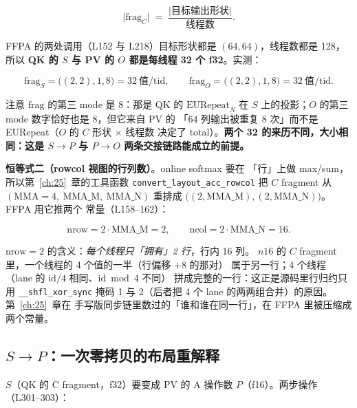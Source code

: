 \begin{equation}
  \bigl|\mathrm{frag}_C\bigr| \;=\;
  \frac{\bigl|\text{目标输出形状}\bigr|}{\text{线程数}} .
  \label{eq:26-csize}
\end{equation}

FFPA 的两处调用（L152 与 L218）目标形状都是 $(64,64)$，线程数都是 128，
所以 \textbf{QK 的 $S$ 与 PV 的 $O$ 都是每线程 32 个 f32}。实测：

\begin{equation}
  \mathrm{frag}_S = \bigl((2,2),1,8\bigr) = 32\ \text{值/tid},\qquad
  \mathrm{frag}_O = \bigl((2,2),1,8\bigr) = 32\ \text{值/tid} .
  \label{eq:26-frag32}
\end{equation}

注意 $\mathrm{frag}$ 的第三 mode 是 8：那是 QK 的 $\mathrm{EURepeat}_N$
在 $S$ 上的投影；$O$ 的第三 mode 数字恰好也是 8，但它来自 PV 的
「$64$ 列输出被重复 8 次」而不是 EURepeat（$O$ 的 $C$ 形状 $\times$ 线程数
决定了 total）。\textbf{两个 32 的来历不同，大小相同：这是 $S\to P$ 与
$P\to O$ 两条交接链路能成立的前提。}

\textbf{恒等式二（rowcol 视图的行列数）}。online softmax 要在
「行」上做 max/sum，所以第~\ref{ch:25}~章的工具函数
\texttt{convert\_\allowbreak{}layout\_\allowbreak{}acc\_\allowbreak{}rowcol} 把 $C$ fragment 从
$(\mathrm{MMA}=4,\ \mathrm{MMA\_M},\ \mathrm{MMA\_N})$ 重排成
$\bigl((2,\mathrm{MMA\_M}), (2,\mathrm{MMA\_N})\bigr)$。FFPA 用它推两个
常量（L158--162）：

\begin{equation}
  \mathrm{nrow} = 2\cdot\mathrm{MMA\_M} = 2, \qquad
  \mathrm{ncol} = 2\cdot\mathrm{MMA\_N} = 16 .
  \label{eq:26-rowcol}
\end{equation}

$\mathrm{nrow}=2$ 的含义：\emph{每个线程只「拥有」2 行}，行内 16 列。
$n16$ 的 $C$ fragment 里，一个线程的 4 个值的一半（行偏移 $+8$ 的那对）
属于另一行；4 个线程（lane 的 $\text{id}/4$ 相同、$\text{id}\bmod 4$ 不同）
拼成完整的一行：这正是源码里行归约只用 \texttt{\_\allowbreak{}\_\allowbreak{}shfl\_\allowbreak{}xor\_\allowbreak{}sync}
掩码 1 与 2（后者把 4 个 lane 的两两组合并）的原因。第~\ref{ch:25}~章在
手写版同步链里数过的「谁和谁在同一行」，在 FFPA 里被压缩成两个常量。

\subsection{$S \to P$：一次零拷贝的布局重解释}

$S$（QK 的 C fragment，f32）要变成 PV 的 A 操作数 $P$（f16）。两步操作
（L301--303）：

